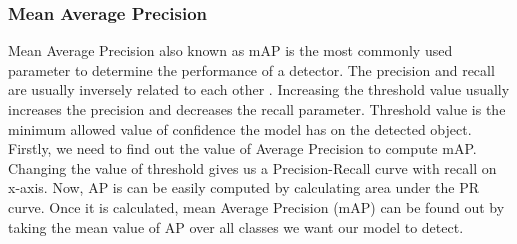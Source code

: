 \subsubsection{Mean Average Precision}
Mean Average Precision also known as mAP is the most commonly used parameter to determine the
performance of a detector. The precision and recall are usually inversely related to each other . Increasing the threshold value usually increases the precision and decreases the recall parameter. Threshold value is the minimum allowed value of confidence the model has on the detected object. Firstly, we need to find out the value of Average Precision to compute mAP. Changing the value of threshold gives us a Precision-Recall curve with recall on x-axis. Now, AP is can be easily computed by calculating area under the PR curve. Once it is calculated, mean Average Precision (mAP) can be found out by taking the mean value of AP over all classes we want our model to detect.
